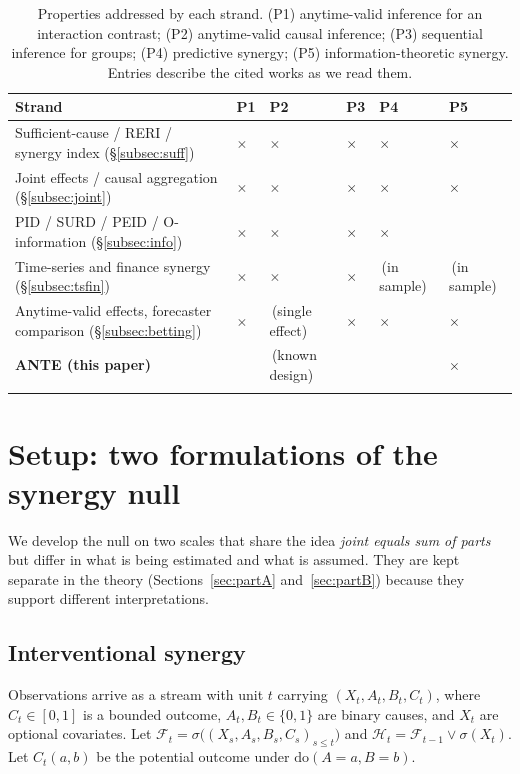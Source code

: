 \documentclass[pdflatex,sn-mathphys-ay]{sn-jnl}%
\theoremstyle{thmstyleone}%
\theoremstyle{thmstyletwo}%
\theoremstyle{thmstylethree}%
\newcommand{\F}{\mathcal{F}}
\newcommand{\cmk}{\checkmark}
\newcommand{\xmk}{\ensuremath{\times}}
\begin{document}
\begin{table}[h]
\caption{Properties addressed by each strand. (P1) anytime-valid inference for an
interaction contrast; (P2) anytime-valid causal inference; (P3) sequential inference for
groups; (P4) predictive synergy; (P5) information-theoretic synergy.
Entries describe the cited works as we read them.}\label{tab:gap}
\small
\begin{tabular*}{\textwidth}{@{\extracolsep\fill}p{4.7cm}p{0.8cm}p{0.8cm}p{0.8cm}p{1.9cm}p{1.9cm}}
\toprule
Strand & P1 & P2 & P3 & P4 & P5 \\
\midrule
Sufficient-cause / RERI / synergy index (\S\ref{subsec:suff}) & \xmk & \xmk & \xmk & \xmk & \xmk \\
Joint effects / causal aggregation (\S\ref{subsec:joint}) & \xmk & \xmk & \xmk & \xmk & \xmk \\
PID / SURD / PEID / O-information (\S\ref{subsec:info}) & \xmk & \xmk & \xmk & \xmk & \cmk \\
Time-series and finance synergy (\S\ref{subsec:tsfin}) & \xmk & \xmk & \xmk & \cmk\,(in sample) & \cmk\,(in sample) \\
Anytime-valid effects, forecaster comparison (\S\ref{subsec:betting}) & \xmk & \cmk\,(single effect) & \xmk & \xmk & \xmk \\
\textbf{ANTE (this paper)} & \cmk & \cmk\,(known design) & \cmk & \cmk & \xmk \\
\botrule
\end{tabular*}
\end{table}

\section{Setup: two formulations of the synergy null}\label{sec:setup}

We develop the null on two scales that share the idea \emph{joint equals sum of
parts} but differ in what is being estimated and what is assumed. They are kept
separate in the theory (Sections~\ref{sec:partA} and~\ref{sec:partB}) because they
support different interpretations.

\subsection{Interventional synergy}\label{subsec:setup-int}

Observations arrive as a stream with unit $t$ carrying $(X_t,A_t,B_t,C_t)$, where
$C_t\in[0,1]$ is a bounded outcome, $A_t,B_t\in\{0,1\}$ are binary causes, and $X_t$ are
optional covariates. Let $\F_t=\sigma\big((X_s,A_s,B_s,C_s)_{s\le t}\big)$ and
$\mathcal H_t=\F_{t-1}\vee\sigma(X_t)$. Let $C_t(a,b)$ be the potential outcome
under $\mathrm{do}(A=a,B=b)$.
\end{document}

